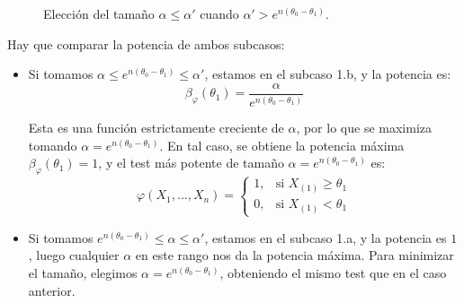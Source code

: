 \begin{ejercicio}
\begin{enumerate}
\begin{figure}[ht]
            \caption{Elección del tamaño $\alpha \le \alpha'$ cuando $\alpha' > e^{n(\theta_0 - \theta_1)}$.}
            \label{fig:nivel_alpha}
        \end{figure}
        
        Hay que comparar la potencia de ambos subcasos:
        \begin{itemize}
            \item Si tomamos $\alpha\leq e^{n(\theta_0 - \theta_1)}\leq \alpha'$, estamos en el subcaso 1.b, y la potencia es:
            \begin{equation*}
                \beta_\varphi(\theta_1) = \frac{\alpha}{e^{n(\theta_0 - \theta_1)}}
            \end{equation*}

            Esta es una función estrictamente creciente de $\alpha$, por lo que se maximiza tomando $\alpha = e^{n(\theta_0 - \theta_1)}$. En tal caso, se obtiene la potencia máxima $\beta_\varphi(\theta_1) = 1$, y el test más potente de tamaño $\alpha = e^{n(\theta_0 - \theta_1)}$ es:
            \begin{equation*}
                \varphi(X_1, \dots, X_n) =
                \begin{cases}
                    1, & \text{si } X_{(1)} \ge \theta_1 \\
                    0, & \text{si } X_{(1)} < \theta_1
                \end{cases}
            \end{equation*}

            \item Si tomamos $e^{n(\theta_0 - \theta_1)} \leq \alpha \leq \alpha'$, estamos en el subcaso 1.a, y la potencia es $1$, luego cualquier $\alpha$ en este rango nos da la potencia máxima. Para minimizar el tamaño, elegimos $\alpha = e^{n(\theta_0 - \theta_1)}$, obteniendo el mismo test que en el caso anterior.
        \end{itemize}
    \end{enumerate}
\end{ejercicio}


